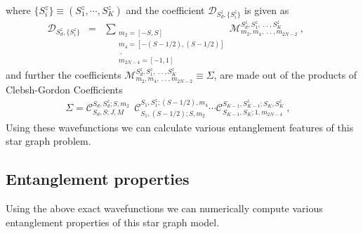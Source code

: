\documentclass[reprint,prb,superscriptaddress]{revtex4-2}
\begin{document}
where $\{S_i^z\}\equiv(S_1^z,\cdots,S_K^z)$ and the coefficient $\mathcal{D}_{S_d^z,\{S_i^z\}}$ is given as 
\begin{eqnarray}
\mathcal{D}_{S_d^z,\{S_i^z\}}  &=& \displaystyle\sum_{\substack{m_2=[-S,S]\\ m_4=[-(S-1/2),(S-1/2)]\\~.~\\  m_{2N-4}=[-1,1]   }} \mathcal{M}^{S_d^z,S_1^z,~.~.~ ,S_K^z}_{m_2,m_4,~.~.~ ,m_{2N-2}}~,~~~~~~
\end{eqnarray}
and further the coefficients $\mathcal{M}^{S_d^z,S_1^z,~.~.~ ,S_K^z}_{m_2,m_4,~.~.~, m_{2N-2}} \equiv\Sigma$, are made out of the products of Clebsh-Gordon Coefficients
\begin{eqnarray}
\Sigma=\mathcal{C}^{S_d,S_d^z;S,m_2}_{S_d,S;J,M} ~~ \mathcal{C}^{S_1,S_1^z;(S-1/2),m_4}_{S_1,(S-1/2);S,m_2} \cdots  \mathcal{C}^{S_{K-1},S_{K-1}^z;S_K,S_K^z}_{S_{K-1},S_{K};1,m_{2N-4}}~,~~~~
\end{eqnarray}
Using these wavefunctions we can calculate various entanglement features of this star graph problem.


\subsection{Entanglement properties}
\noindent Using the above exact wavefunctions we can numerically compute various entanglement properties of this star graph model. 
\end{document}
